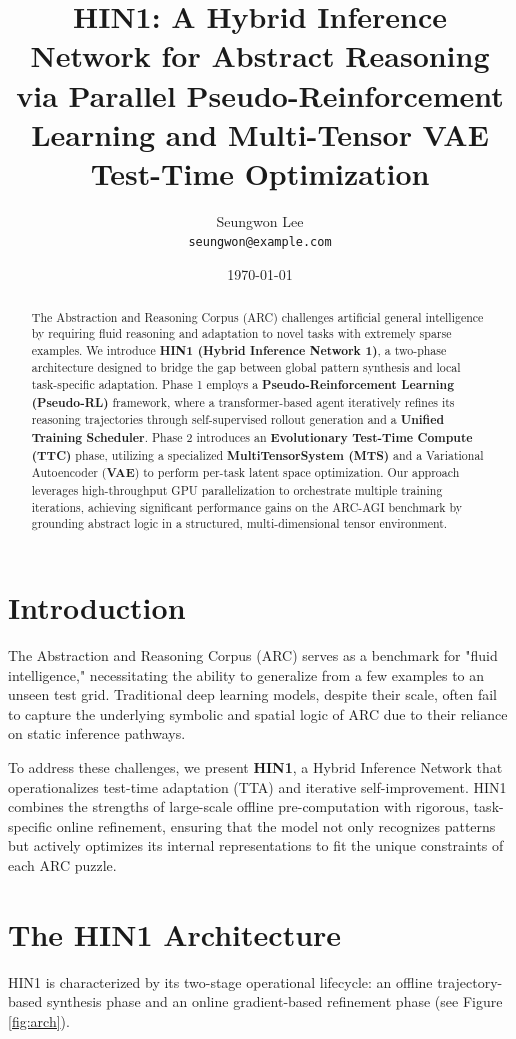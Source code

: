 \documentclass[11pt,a4paper]{article}
\title{HIN1: A Hybrid Inference Network for Abstract Reasoning via Parallel Pseudo-Reinforcement Learning and Multi-Tensor VAE Test-Time Optimization}
\author{Seungwon Lee \\ \texttt{seungwon@example.com}}
\date{\today}
\begin{document}
\maketitle

\begin{abstract}
The Abstraction and Reasoning Corpus (ARC) challenges artificial general intelligence by requiring fluid reasoning and adaptation to novel tasks with extremely sparse examples. We introduce \textbf{HIN1 (Hybrid Inference Network 1)}, a two-phase architecture designed to bridge the gap between global pattern synthesis and local task-specific adaptation. Phase 1 employs a \textbf{Pseudo-Reinforcement Learning (Pseudo-RL)} framework, where a transformer-based agent iteratively refines its reasoning trajectories through self-supervised rollout generation and a \textbf{Unified Training Scheduler}. Phase 2 introduces an \textbf{Evolutionary Test-Time Compute (TTC)} phase, utilizing a specialized \textbf{MultiTensorSystem (MTS)} and a Variational Autoencoder (\textbf{VAE}) to perform per-task latent space optimization. Our approach leverages high-throughput GPU parallelization to orchestrate multiple training iterations, achieving significant performance gains on the ARC-AGI benchmark by grounding abstract logic in a structured, multi-dimensional tensor environment.
\end{abstract}

\section{Introduction}
The Abstraction and Reasoning Corpus (ARC) \cite{chollet2019measure} serves as a benchmark for "fluid intelligence," necessitating the ability to generalize from a few examples to an unseen test grid. Traditional deep learning models, despite their scale, often fail to capture the underlying symbolic and spatial logic of ARC due to their reliance on static inference pathways.

To address these challenges, we present \textbf{HIN1}, a Hybrid Inference Network that operationalizes test-time adaptation (TTA) and iterative self-improvement. HIN1 combines the strengths of large-scale offline pre-computation with rigorous, task-specific online refinement, ensuring that the model not only recognizes patterns but actively optimizes its internal representations to fit the unique constraints of each ARC puzzle.

\section{The HIN1 Architecture}
HIN1 is characterized by its two-stage operational lifecycle: an offline trajectory-based synthesis phase and an online gradient-based refinement phase (see Figure \ref{fig:arch}).
\end{document}
